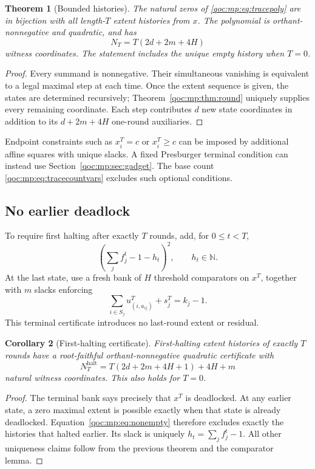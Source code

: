 \documentclass[11pt,letterpaper]{article}
\newtheorem{theorem}{Theorem}[section]
\newtheorem{corollary}[theorem]{Corollary}
\theoremstyle{definition}
\theoremstyle{remark}
\newcommand{\N}{\mathbb N}
\begin{document}
\begin{theorem}[Bounded histories]\label{qoc:mp:thm:traces}
The natural zeros of \eqref{qoc:mp:eq:tracepoly} are in bijection with all
length-$T$ extent histories from $x$. The polynomial is orthant-nonnegative
and quadratic, and has
\begin{equation}\label{qoc:mp:eq:tracecountvars}
 N_T=T(2d+2m+4H)
\end{equation}
witness coordinates. The statement includes the unique empty history when
$T=0$.
\end{theorem}
\begin{proof}
Every summand is nonnegative. Their simultaneous vanishing is equivalent
to a legal maximal step at each time. Once the extent sequence is given,
the states are determined recursively; Theorem~\ref{qoc:mp:thm:round} uniquely
supplies every remaining coordinate. Each step contributes $d$ new state
coordinates in addition to its $d+2m+4H$ one-round auxiliaries.
\end{proof}

Endpoint constraints such as $x^T_i=c$ or $x^T_i\ge c$ can be imposed by
additional affine squares with unique slacks. A fixed Presburger terminal
condition can instead use Section~\ref{qoc:mp:sec:gadget}. The base count
\eqref{qoc:mp:eq:tracecountvars} excludes such optional conditions.

\subsection{No earlier deadlock}
To require first halting after exactly $T$ rounds, add, for $0\le t<T$,
\begin{equation}\label{qoc:mp:eq:nonempty}
 \left(\sum_j f^t_j-1-h_t\right)^2,
 \qquad h_t\in\N.
\end{equation}
At the last state, use a fresh bank of $H$ threshold comparators on
$x^T$, together with $m$ slacks enforcing
\[
 \sum_{i\in S_j}u^T_{(i,a_{ij})}+s^T_j=k_j-1.
\]
This terminal certificate introduces no last-round extent or residual.

\begin{corollary}[First-halting certificate]\label{qoc:mp:cor:firsthalt}
First-halting extent histories of exactly $T$ rounds have a root-faithful
orthant-nonnegative quadratic certificate with
\begin{equation}\label{qoc:mp:eq:firsthaltvars}
 N_T^{\mathrm{halt}}
 =T(2d+2m+4H+1)+4H+m
\end{equation}
natural witness coordinates. This also holds for $T=0$.
\end{corollary}
\begin{proof}
The terminal bank says precisely that $x^T$ is deadlocked. At any earlier
state, a zero maximal extent is possible exactly when that state is
already deadlocked. Equation~\eqref{qoc:mp:eq:nonempty} therefore excludes exactly
the histories that halted earlier. Its slack is uniquely
$h_t=\sum_jf^t_j-1$. All other uniqueness claims follow from the previous
theorem and the comparator lemma.
\end{proof}
\end{document}
